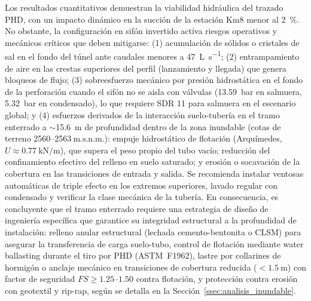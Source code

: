 Los resultados cuantitativos demuestran la viabilidad hidráulica del trazado PHD, con un impacto dinámico en la succión de la estación Km8 menor al \SI{2}{\percent}. No obstante, la configuración en sifón invertido activa riesgos operativos y mecánicos críticos que deben mitigarse: (1) acumulación de sólidos o cristales de sal en el fondo del túnel ante caudales menores a \SI{47}{\liter\per\second}; (2) entrampamiento de aire en las crestas superiores del perfil (lanzamiento y llegada) que genera bloqueos de flujo; (3) sobreesfuerzo mecánico por presión hidrostática en el fondo de la perforación cuando el sifón no se aisla con válvulas (\SI{13.59}{bar} en salmuera, \SI{5.32}{bar} en condensado), lo que requiere SDR 11 para salmuera en el escenario global; y (4) esfuerzos derivados de la interacción suelo-tubería en el tramo enterrado a $\sim$\SI{15.6}{\meter} de profundidad dentro de la zona inundable (cotas de terreno 2560--2563$\ \text{m.s.n.m.}$): empuje hidrostático de flotación (Arquímedes, $U \approx \SI{0.77}{\kilo\newton\per\meter}$), que supera el peso propio del tubo vacío; reducción del confinamiento efectivo del relleno en suelo saturado; y erosión o socavación de la cobertura en las transiciones de entrada y salida. Se recomienda instalar ventosas automáticas de triple efecto en los extremos superiores, lavado regular con condensado y verificar la clase mecánica de la tubería. En consecuencia, es concluyente que el tramo enterrado requiere una estrategia de diseño de ingeniería específica que garantice su integridad estructural a la profundidad de instalación: relleno anular estructural (lechada cemento-bentonita o CLSM) para asegurar la transferencia de carga suelo-tubo, control de flotación mediante water ballasting durante el tiro por PHD (ASTM~F1962), lastre por collarines de hormigón o anclaje mecánico en transiciones de cobertura reducida ($<\SI{1.5}{\meter}$) con factor de seguridad $FS \geq 1.25$--$1.50$ contra flotación, y protección contra erosión con geotextil y rip-rap, según se detalla en la Sección~\ref{ssec:analisis_inundable}.

\newpage
